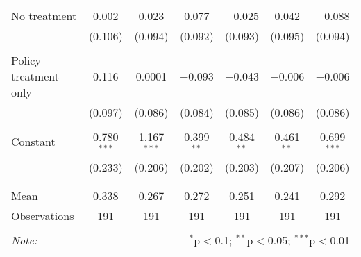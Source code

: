 \begin{tabular}{@{\extracolsep{5pt}}lcccccc}
 No treatment & 0.002 & 0.023 & 0.077 & $-$0.025 & 0.042 & $-$0.088 \\ 
  & (0.106) & (0.094) & (0.092) & (0.093) & (0.095) & (0.094) \\ 
  & & & & & & \\ 
 Policy treatment only & 0.116 & 0.0001 & $-$0.093 & $-$0.043 & $-$0.006 & $-$0.006 \\ 
  & (0.097) & (0.086) & (0.084) & (0.085) & (0.086) & (0.086) \\ 
  & & & & & & \\ 
 Constant & 0.780$^{***}$ & 1.167$^{***}$ & 0.399$^{**}$ & 0.484$^{**}$ & 0.461$^{**}$ & 0.699$^{***}$ \\ 
  & (0.233) & (0.206) & (0.202) & (0.203) & (0.207) & (0.206) \\ 
  & & & & & & \\ 
\hline \\[-1.8ex] 
Mean & 0.338 & 0.267 & 0.272 & 0.251 & 0.241 & 0.292 \\ 
Observations & 191 & 191 & 191 & 191 & 191 & 191 \\ 
\hline 
\hline \\[-1.8ex] 
\textit{Note:}  & \multicolumn{6}{r}{$^{*}$p$<$0.1; $^{**}$p$<$0.05; $^{***}$p$<$0.01} \\ 
\end{tabular} 
